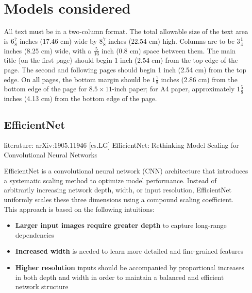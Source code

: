 \section{Models considered}
\label{sec:formatting}

All text must be in a two-column format.
The total allowable size of the text area is $6\frac78$ inches (17.46 cm) wide by $8\frac78$ inches (22.54 cm) high.
Columns are to be $3\frac14$ inches (8.25 cm) wide, with a $\frac{5}{16}$ inch (0.8 cm) space between them.
The main title (on the first page) should begin 1 inch (2.54 cm) from the top edge of the page.
The second and following pages should begin 1 inch (2.54 cm) from the top edge.
On all pages, the bottom margin should be $1\frac{1}{8}$ inches (2.86 cm) from the bottom edge of the page for $8.5 \times 11$-inch paper;
for A4 paper, approximately $1\frac{5}{8}$ inches (4.13 cm) from the bottom edge of the
page.

\subsection{EfficientNet}
literature: arXiv:1905.11946 [cs.LG] EfficientNet: Rethinking Model Scaling for Convolutional Neural Networks

EfficientNet is a convolutional neural network (CNN) architecture that introduces a systematic scaling method to optimize model performance. 
Instead of arbitrarily increasing network depth, width, or input resolution, EfficientNet uniformly scales these three dimensions using a compound scaling coefficient. 
This approach is based on the following intuitions:
\begin{itemize}
\item {\bf Larger input images require greater depth} to capture long-range dependencies 
\item {\bf Increased width} is needed to learn more detailed and fine-grained features 
\item {\bf Higher resolution} inputs should be accompanied by proportional increases in both depth and width in order to maintain a balanced and efficient network structure
\end{itemize}

